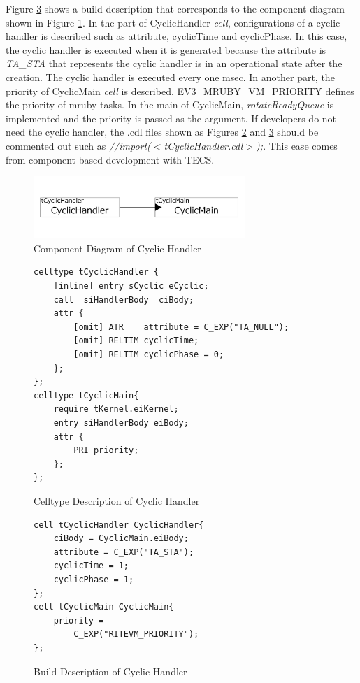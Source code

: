 \documentclass[conference,compsoc]{IEEEtran}
\begin{document}
Figure \ref{build_cyclic_handler} shows a build description that corresponds to the component diagram shown in Figure \ref{fig:cyclic_handler}.
In the part of CyclicHandler {\it cell}, configurations of a cyclic handler is described such as attribute, cyclicTime and cyclicPhase.
In this case, the cyclic handler is executed when it is generated because the attribute is {\it TA\_STA} that represents the cyclic handler is in an operational state after the creation.
The cyclic handler is executed every one msec.
In another part, the priority of CyclicMain {\it cell} is described.
EV3\_MRUBY\_VM\_PRIORITY defines the priority of mruby tasks.
In the main of CyclicMain, {\it rotateReadyQueue} is implemented and the priority is passed as the argument.
If developers do not need the cyclic handler, the .cdl files shown as Figures \ref{celltype_cyclic_handler} and \ref{build_cyclic_handler} should be commented out such as {\it //import($<$tCyclicHandler.cdl$>$);}.
This ease comes from component-based development with TECS.

\begin{figure}[t]
    \centering
    \includegraphics[width=8cm,clip]{figure/cyclic_handler.pdf}
    \caption{Component Diagram of Cyclic Handler}
    \label{fig:cyclic_handler}
\end{figure}
\begin{figure}[t]
    \centering
    \begin{lstlisting}
celltype tCyclicHandler {
    [inline] entry sCyclic eCyclic;
    call  siHandlerBody  ciBody;
    attr {
    	[omit] ATR    attribute = C_EXP("TA_NULL");
    	[omit] RELTIM cyclicTime;
    	[omit] RELTIM cyclicPhase = 0;
    };
};
celltype tCyclicMain{
    require tKernel.eiKernel;
    entry siHandlerBody eiBody;
    attr {
        PRI priority;
    };
};
    \end{lstlisting}
    \caption{Celltype Description of Cyclic Handler}
    \label{celltype_cyclic_handler}
\end{figure}
\begin{figure}[t]
    \centering
    \begin{lstlisting}
cell tCyclicHandler CyclicHandler{
    ciBody = CyclicMain.eiBody;
    attribute = C_EXP("TA_STA");
    cyclicTime = 1;
    cyclicPhase = 1;
};
cell tCyclicMain CyclicMain{
    priority =
        C_EXP("RITEVM_PRIORITY");
};
   \end{lstlisting}
    \caption{Build Description of Cyclic Handler}
    \label{build_cyclic_handler}
\end{figure}
 
\end{document}
